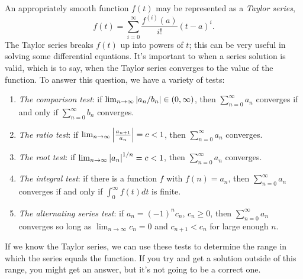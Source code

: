 \documentclass[10pt,driverfallback=hypertex]{report}
\begin{document}
An appropriately smooth function $f(t)$ may be represented as a 
\emph{Taylor series},
\begin{dmath*}
  \boxed{f(t)=\sum_{i=0}^\infty \frac{f^{(i)}(a)}{i!}(t-a)^i}.
\end{dmath*}
The Taylor series breaks $f(t)$ up into powers of $t$; this can be
very useful in solving some differential equations.  It's important to when
a series solution is valid, which is to say, when the Taylor series
converges to the value of the function. To answer this question, we have
a variety of tests:
\begin{enumerate}
\item \emph{The comparison test}: if $\lim_{n \rightarrow \infty}
  \abs{a_n/b_n} \in (0,\infty)$, then $\sum_{n=0}^\infty a_n$
  converges if and only if $\sum_{n=0}^\infty b_n$ converges.
\item \emph{The ratio test}: if
  $\lim_{n\rightarrow\infty}\abs{\frac{a_{n+1}}{a_n}}=c < 1$, then
  $\sum_{n=0}^\infty a_n$ converges.
\item \emph{The root test}: if $\lim_{n\rightarrow\infty}\abs{a_n}^{1/n}=c < 1$,
  then $\sum_{n=0}^\infty a_n$ converges.
\item \emph{The integral test}: if there is a function $f$ with
  $f(n)=a_n$, then $\sum_{n=0}^\infty a_n$ converges if and only if
  $\int_0^\infty f(t) dt$ is finite.
\item \emph{The alternating series test}: if $a_n = (-1)^n c_n$, $c_n \geq
  0$, then $\sum_{n=0}^\infty a_n$ converges so long as
  $\lim_{n\rightarrow\infty}c_n=0$ and $c_{n+1} < c_n$ for large
  enough $n$.
\end{enumerate}
If we know the Taylor series, we can use these tests to determine the
range in which the series equals the function. If you try and get a
solution outside of this range, you might get an answer, but it's not
going to be a correct one.
\\

\end{document}
